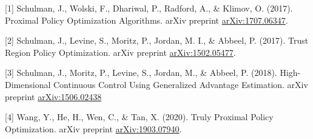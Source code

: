 \documentclass{article}
\begin{document}
[1] Schulman, J., Wolski, F., Dhariwal, P., Radford, A., \& Klimov, O. (2017). Proximal Policy Optimization Algorithms. arXiv preprint \href{https://arxiv.org/abs/1707.06347}{arXiv:1707.06347}.

[2] Schulman, J., Levine, S., Moritz, P., Jordan, M. I., \& Abbeel, P. (2017). Trust Region Policy Optimization. arXiv preprint \href{https://arxiv.org/abs/1502.05477}{arXiv:1502.05477}.

[3] Schulman, J., Moritz, P., Levine, S., Jordan, M., \& Abbeel, P. (2018). High-Dimensional Continuous Control Using Generalized Advantage Estimation. arXiv preprint \href{https://arxiv.org/abs/1506.02438}{arXiv:1506.02438}

[4] Wang, Y., He, H., Wen, C., \& Tan, X. (2020). Truly Proximal Policy Optimization. arXiv preprint \href{https://arxiv.org/abs/1903.07940}{arXiv:1903.07940}.
\end{document}
